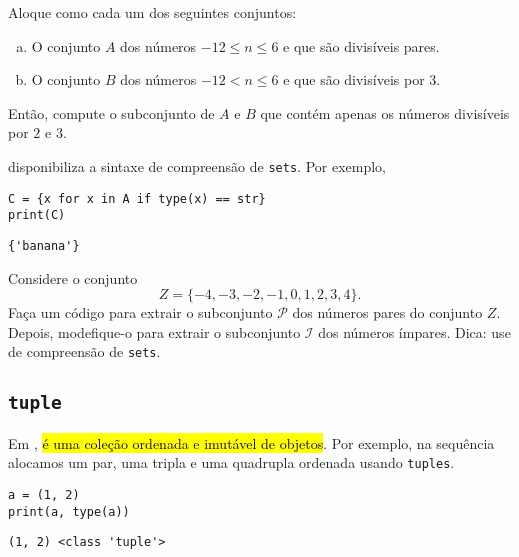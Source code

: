 \documentclass[12pt]{article}
\begin{document}
\begin{exr}
  Aloque como {\PYTHONset} cada um dos seguintes conjuntos:
  \begin{enumerate}[a)]
    \item O conjunto $A$ dos números $-12 \leq n \leq 6$ e que são divisíveis pares.
    \item O conjunto $B$ dos números $-12 < n \leq 6$ e que são divisíveis por 3.
  \end{enumerate}
  Então, compute o subconjunto de $A$ e $B$ que contém apenas os números divisíveis por $2$ e $3$.
\end{exr}

\begin{obs}\label{obs:compreensão_de_conjuntos}
  {\python} disponibiliza a sintaxe de compreensão de \texttt{sets}. Por exemplo,

\begin{lstlisting}
C = {x for x in A if type(x) == str}
print(C)
\end{lstlisting}

\begin{verbatim}
{'banana'}
\end{verbatim}

\end{obs}

\begin{exr}
  Considere o conjunto
  \begin{equation}
    Z = \{-4, -3, -2, -1, 0, 1, 2, 3, 4\}.
  \end{equation}
  Faça um código {\python} para extrair o subconjunto $\mathcal{P}$ dos números pares do conjunto $Z$. Depois, modefique-o para extrair o subconjunto $\mathcal{I}$ dos números ímpares. Dica: use de compreensão de \texttt{sets}.
\end{exr}

\subsection{\texttt{tuple}}

Em {\python}, \hl{{\PYTHONtuple} é uma coleção ordenada e imutável de objetos}. Por exemplo, na sequência alocamos um par, uma tripla e uma quadrupla ordenada usando \texttt{tuples}.

\begin{lstlisting}
a = (1, 2)
print(a, type(a))
\end{lstlisting}

\begin{verbatim}
(1, 2) <class 'tuple'>
\end{verbatim}
\end{document}
